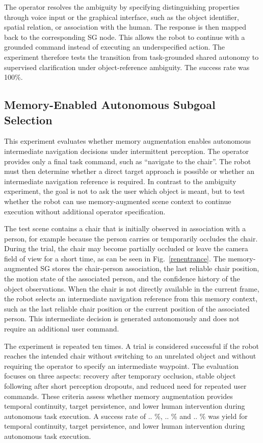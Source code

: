 \documentclass[lettersize,journal]{IEEEtran}
\begin{document}
The operator resolves the ambiguity by specifying distinguishing properties through voice input or the graphical interface, such as the object identifier, spatial relation, or association with the human. The response is then mapped back to the corresponding SG node. This allows the robot to continue with a grounded command instead of executing an underspecified action. The experiment therefore tests the transition from task-grounded shared autonomy to supervised clarification under object-reference ambiguity. The success rate was 100\%.

\subsection{Memory-Enabled Autonomous Subgoal Selection}
\label{memory_enabled_subgoal_selection}

This experiment evaluates whether memory augmentation enables autonomous intermediate navigation decisions under intermittent perception. The operator provides only a final task command, such as ``navigate to the chair''. The robot must then determine whether a direct target approach is possible or whether an intermediate navigation reference is required. In contrast to the ambiguity experiment, the goal is not to ask the user which object is meant, but to test whether the robot can use memory-augmented scene context to continue execution without additional operator specification.

The test scene contains a chair that is initially observed in association with a person, for example because the person carries or temporarily occludes the chair. During the trial, the chair may become partially occluded or leave the camera field of view for a short time, as can be seen in Fig.~\ref{renentrance}. The memory-augmented SG stores the chair-person association, the last reliable chair position, the motion state of the associated person, and the confidence history of the object observations. When the chair is not directly available in the current frame, the robot selects an intermediate navigation reference from this memory context, such as the last reliable chair position or the current position of the associated person. This intermediate decision is generated autonomously and does not require an additional user command.

The experiment is repeated ten times. A trial is considered successful if the robot reaches the intended chair without switching to an unrelated object and without requiring the operator to specify an intermediate waypoint. The evaluation focuses on three aspects: recovery after temporary occlusion, stable object following after short perception dropouts, and reduced need for repeated user commands. These criteria assess whether memory augmentation provides temporal continuity, target persistence, and lower human intervention during autonomous task execution. A success rate of .. \%, .. \% and .. \% was yield for temporal continuity, target persistence, and lower human intervention during autonomous task execution.
\end{document}
